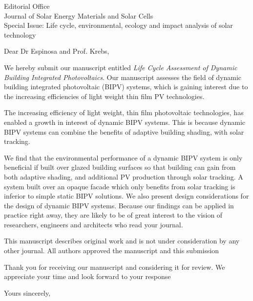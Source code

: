 \documentclass[a4paper,12pt]{letter}
\begin{document}
\begin{letter}{Editorial Office \\ Journal of Solar Energy Materials and Solar Cells\\ Special Issue: Life cycle, environmental, ecology and impact analysis of solar technology}
	\opening{Dear Dr Espinosa and Prof. Krebs,}
	We hereby submit our manuscript entitled \emph{Life Cycle Assessment of Dynamic Building Integrated Photovoltaics}. 
	Our manuscript assesses the field of dynamic building integrated photovoltaic (BIPV) systems, which is gaining interest due to the increasing efficiencies of light weight thin film PV technologies. 


	The increasing efficiency of light weight, thin film photovoltaic technologies, has enabled a growth in interest of dynamic BIPV systems. This is because dynamic BIPV systems can combine the benefits of adaptive building shading, with solar tracking. 


	We find that the environmental performance of a dynamic BIPV system is only beneficial if built over glazed building surfaces so that building can gain from both adaptive shading, and additional PV production through solar tracking. A system built over an opaque facade which only benefits from solar tracking is inferior to simple static BIPV solutions. We also present design considerations for the design of dynamic BIPV systems.
	Because our findings can be applied in practice right away, they are likely to be of great interest to the vision of researchers, engineers and architects who read your journal. 




	This manuscript describes original work and is not under consideration by any other journal. All authors approved the manuscript and this submission




	Thank you for receiving our manuscript and considering it for review. We appreciate your time and look forward to your response

	\signature{Prageeth Jayathissa}
	\closing{Yours sincerely,}
\end{letter}

	
\end{document}
